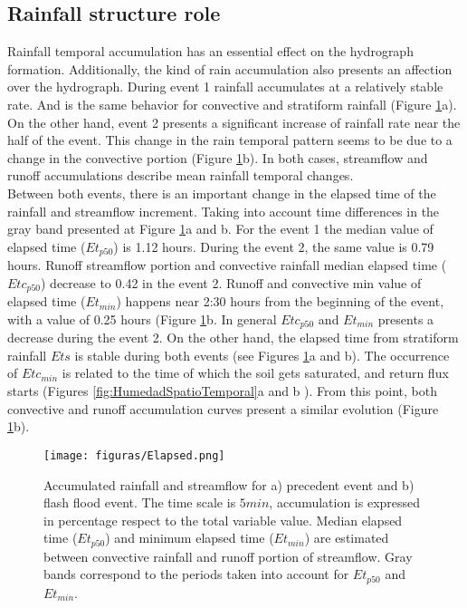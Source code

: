 {\subsection{Rainfall structure role}

Rainfall temporal accumulation has an essential effect on the hydrograph formation. Additionally, the kind of rain accumulation also presents an affection over the hydrograph.  During event 1 rainfall accumulates at a relatively stable rate.  And is the same behavior for convective and stratiform rainfall (Figure \ref{fig:lluviaElapsedCaudal}a).  On the other hand, event 2 presents a significant increase of rainfall rate near the half of the event.  This change in the rain temporal pattern seems to be due to a change in the convective portion (Figure \ref{fig:lluviaElapsedCaudal}b).  In both cases, streamflow and runoff accumulations describe mean rainfall temporal changes.\\ 

Between both events, there is an important change in the elapsed time of the rainfall and streamflow increment. Taking into account time differences in the gray band presented at Figure \ref{fig:lluviaElapsedCaudal}a and b.  For the event 1 the median value of elapsed time ($Et_{p50}$) is 1.12 hours. During the event 2, the same value is 0.79 hours.  Runoff streamflow portion and convective rainfall median elapsed time ($Etc_{p50}$) decrease to 0.42 in the event 2.  Runoff and convective min value of elapsed time ($Et_{min}$) happens near 2:30 hours from the beginning of the event, with a value of 0.25 hours (Figure \ref{fig:lluviaElapsedCaudal}b.  In general  $Etc_{p50}$ and $Et_{min}$ presents a decrease during the event 2.  On the other hand, the elapsed time from stratiform rainfall $Ets$ is stable during both events (see Figures \ref{fig:lluviaElapsedCaudal}a and b).  The occurrence of $Etc_{min}$ is related to the time of which the soil gets saturated, and return flux starts (Figures \ref{fig:HumedadSpatioTemporal}a and b ).  From this point, both convective and runoff accumulation curves present a similar evolution (Figure \ref{fig:lluviaElapsedCaudal}b).\\ 

\begin{figure}[t]
\centering
 \texttt{[image: figuras/Elapsed.png]}
 \caption{Accumulated rainfall and streamflow for a) precedent event and b) flash flood event. The time scale is $5min$, accumulation is expressed in percentage respect to the total variable value. Median elapsed time ($Et_{p50}$) and minimum elapsed time ($Et_{min}$) are estimated between convective rainfall and runoff portion of streamflow.  Gray bands correspond to the periods taken into account for $Et_{p50}$ and $Et_{min}$.}
    \label{fig:lluviaElapsedCaudal}
\end{figure}

}
